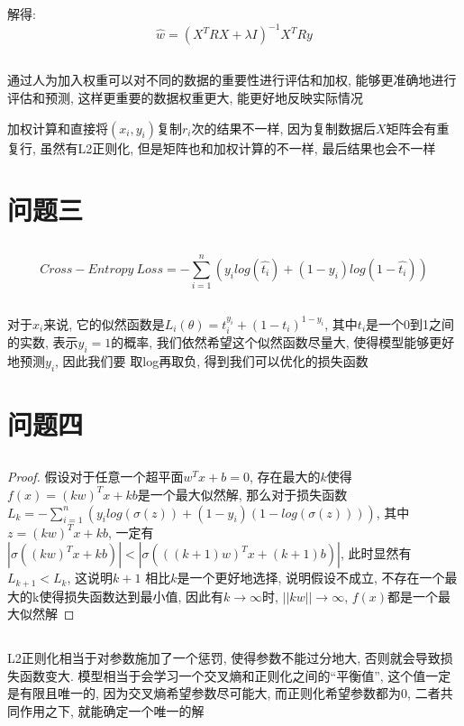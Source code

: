 \documentclass[12pt, a4paper]{article}
\begin{document}
解得:
\begin{equation*}
    \hat{w} = (X^T R X + \lambda I)^{-1} X^T R y
\end{equation*}

\subsection{}

通过人为加入权重可以对不同的数据的重要性进行评估和加权, 能够更准确地进行评估和预测, 
这样更重要的数据权重更大, 能更好地反映实际情况

加权计算和直接将$(x_i,y_i)$复制$r_i$次的结果不一样, 因为复制数据后$X$矩阵会有重复行, 
虽然有L2正则化, 但是矩阵也和加权计算的不一样, 最后结果也会不一样

\section{问题三}


\subsection{}

\begin{equation*}
    Cross-Entropy \ Loss = - \sum_{i=1}^n (y_i log(\hat{t_i})
     + (1-y_i) log (1- \hat{t_i}))
\end{equation*}

\subsection{}

对于$x_i$来说, 它的似然函数是$L_i(\theta) = t_i^{y_i} 
+ (1-t_i)^{1-y_i}$, 其中$t_i$是一个0到1之间的实数, 表示$y_i=1$的概率, 
我们依然希望这个似然函数尽量大, 使得模型能够更好地预测$y_i$, 因此我们要
取log再取负, 得到我们可以优化的损失函数

\section{问题四}


\subsection{}

\newtheorem*{proof}{Proof}

\begin{proof}
    假设对于任意一个超平面$w^T x + b = 0$, 存在最大的$k$使得$f(x) = (kw)^T x + kb$是一个最大似然解, 
    那么对于损失函数$L_k = - \sum_{i=1}^n(y_i log(\sigma(z))+(1-y_i)(1-log(\sigma(z))))$, 其中$z = (kw)^T x + kb$, 
    一定有$|\sigma((kw)^T x + kb)| < |\sigma(((k+1)w)^T x + (k+1)b)|$, 此时显然有$L_{k+1}<L_k$, 这说明$k+1$
    相比$k$是一个更好地选择, 说明假设不成立, 不存在一个最大的k使得损失函数达到最小值, 因此有$k \rightarrow \infty$时, 
    $||kw|| \rightarrow \infty$, $f(x)$都是一个最大似然解
\end{proof}

\subsection{}

L2正则化相当于对参数施加了一个惩罚, 使得参数不能过分地大, 否则就会导致损失函数变大. 
模型相当于会学习一个交叉熵和正则化之间的“平衡值”, 这个值一定是有限且唯一的,
因为交叉熵希望参数尽可能大, 而正则化希望参数都为0, 二者共同作用之下, 就能确定一个唯一的解
\end{document}
